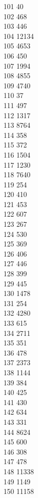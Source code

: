{ 101	40 \\
 102	468 \\
 103	446 \\
 104	12134 \\
 105	4653 \\
 106	450 \\
 107	1994 \\
 108	4855 \\
 109	4740 \\
 110	37 \\
 111	497 \\
 112	1317 \\
 113	8764 \\
 114	358 \\
 115	372 \\
 116	1504 \\
 117	1230 \\
 118	7640 \\
 119	254 \\
 120	410 \\
 121	453 \\
 122	607 \\
 123	267 \\
 124	530 \\
 125	369 \\
 126	406 \\
 127	446 \\
 128	399 \\
 129	445 \\
 130	1478 \\
 131	254 \\
 132	4280 \\
 133	615 \\
 134	2711 \\
 135	351 \\
 136	478 \\
 137	2373 \\
 138	1144 \\
 139	384 \\
 140	425 \\
 141	430 \\
 142	634 \\
 143	331 \\
 144	8624 \\
 145	600 \\
 146	308 \\
 147	478 \\
 148	11338 \\
 149	1149 \\
 150	11158 \\
}
